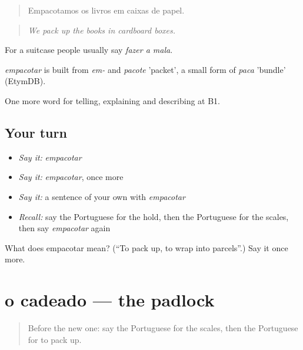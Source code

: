 \begin{quote}
Empacotamos os livros em caixas de papel.
\end{quote}

\begin{quote}
\emph{We pack up the books in cardboard boxes.}
\end{quote}

For a suitcase people usually say \emph{fazer a mala}.

\begin{cousinweb}
\emph{empacotar} is built from \emph{em-} and \emph{pacote} 'packet', a small form of \emph{paca} 'bundle' (EtymDB).
\end{cousinweb}

\begin{grammarlens}[title={What you've built}]
One more word for telling, explaining and describing at B1.
\end{grammarlens}

\subsection*{Your turn}
\begin{itemize}
\raggedright
  \item \emph{Say it:} \emph{empacotar}
  \item \emph{Say it:} \emph{empacotar}, once more
  \item \emph{Say it:} a sentence of your own with \emph{empacotar}
  \item \emph{Recall:} say the Portuguese for the hold, then the Portuguese for the scales, then say \emph{empacotar} again
\end{itemize}

\begin{tcolorbox}[breakable,colback=teal!4,colframe=teal!35!black,title={Before you move on}]
What does empacotar mean? (\textquotedblleft{}To pack up, to wrap into parcels\textquotedblright{}.) Say it once more.
\end{tcolorbox}
\section[o cadeado]{o cadeado — the padlock}

\label{lesson:PT-C422-cadeado}



\begin{quote}
Before the new one: say the Portuguese for the scales, then the Portuguese for to pack up.
\end{quote}

